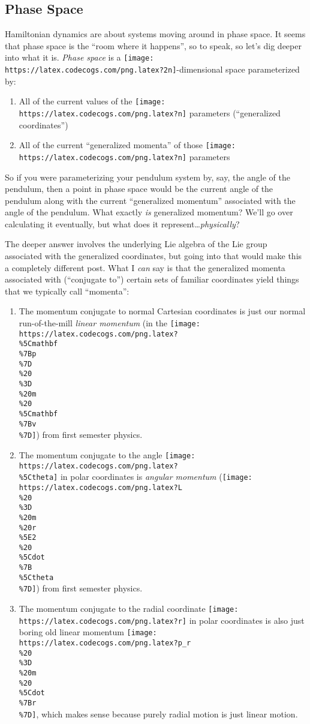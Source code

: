 \documentclass[]{article}
\begin{document}
\hypertarget{phase-space}{%
\subsection{Phase Space}\label{phase-space}}

Hamiltonian dynamics are about systems moving around in phase space. It seems
that phase space is the ``room where it happens'', so to speak, so let's dig
deeper into what it is. \emph{Phase space} is a
\texttt{[image: https://latex.codecogs.com/png.latex?2n]}-dimensional space
parameterized by:

\begin{enumerate}
\def\labelenumi{\arabic{enumi}.}
\tightlist
\item
  All of the current values of the
  \texttt{[image: https://latex.codecogs.com/png.latex?n]} parameters
  (``generalized coordinates'')
\item
  All of the current ``generalized momenta'' of those
  \texttt{[image: https://latex.codecogs.com/png.latex?n]} parameters
\end{enumerate}

So if you were parameterizing your pendulum system by, say, the angle of the
pendulum, then a point in phase space would be the current angle of the pendulum
along with the current ``generalized momentum'' associated with the angle of the
pendulum. What exactly \emph{is} generalized momentum? We'll go over calculating
it eventually, but what does it represent\ldots{}\emph{physically}?

The deeper answer involves the underlying Lie algebra of the Lie group
associated with the generalized coordinates, but going into that would make this
a completely different post. What I \emph{can} say is that the generalized
momenta associated with (``conjugate to'') certain sets of familiar coordinates
yield things that we typically call ``momenta'':

\begin{enumerate}
\def\labelenumi{\arabic{enumi}.}
\item
  The momentum conjugate to normal Cartesian coordinates is just our normal
  run-of-the-mill \emph{linear momentum} (in the
  \texttt{[image: https://latex.codecogs.com/png.latex?\\\%5Cmathbf\\\%7Bp\\\%7D\\\%20\\\%3D\\\%20m\\\%20\\\%5Cmathbf\\\%7Bv\\\%7D]})
  from first semester physics.
\item
  The momentum conjugate to the angle
  \texttt{[image: https://latex.codecogs.com/png.latex?\\\%5Ctheta]} in polar
  coordinates is \emph{angular momentum}
  (\texttt{[image: https://latex.codecogs.com/png.latex?L\\\%20\\\%3D\\\%20m\\\%20r\\\%5E2\\\%20\\\%5Cdot\\\%7B\\\%5Ctheta\\\%7D]})
  from first semester physics.
\item
  The momentum conjugate to the radial coordinate
  \texttt{[image: https://latex.codecogs.com/png.latex?r]} in polar coordinates
  is also just boring old linear momentum
  \texttt{[image: https://latex.codecogs.com/png.latex?p\_r\\\%20\\\%3D\\\%20m\\\%20\\\%5Cdot\\\%7Br\\\%7D]},
  which makes sense because purely radial motion is just linear motion.
\end{enumerate}
\end{document}
